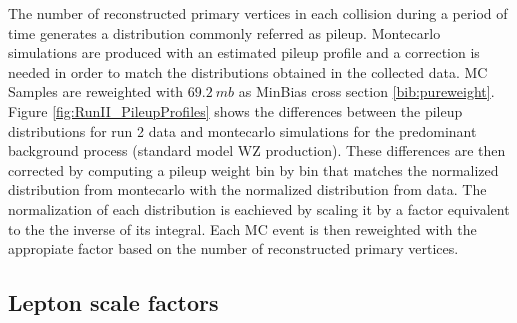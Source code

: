 The number of reconstructed primary vertices in each collision during a period
of time generates a distribution commonly referred as pileup. Montecarlo simulations
are produced with an estimated pileup profile and a correction is needed
in order to match the distributions obtained in the collected data.
MC Samples are reweighted with $69.2~mb$ as MinBias cross section \ref{bib:pureweight}.
Figure \ref{fig:RunII_PileupProfiles} shows the differences between the
pileup distributions for run 2 data and montecarlo
simulations for the predominant background process (standard model
WZ production). These differences are then
corrected by computing a pileup weight bin by bin that matches the normalized
distribution from montecarlo with the normalized distribution from data.
The normalization of each distribution is eachieved by scaling it by a factor
equivalent to the the inverse of its integral. Each MC event is then reweighted
with the appropiate factor based on the number of reconstructed primary vertices. 

\subsection{Lepton scale factors}

